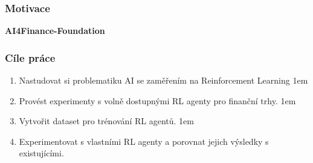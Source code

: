 




\begin{frame}
    \frametitle{Motivace}

    \vspace{1cm}

    \textbf{AI4Finance-Foundation}
\end{frame}

\begin{frame}
    \frametitle{Cíle práce}
    \begin{enumerate}
        \itemsep1em
        \item Nastudovat si problematiku AI se zaměřením na Reinforcement Learning
        \itemsep1em
        \item Provést experimenty s volně dostupnými RL agenty pro finanční trhy.
        \itemsep1em
        \item Vytvořit dataset pro trénování RL agentů.
        \itemsep1em
        \item Experimentovat s vlastními RL agenty a porovnat jejich výsledky s existujícími.
    \end{enumerate}
\end{frame}

